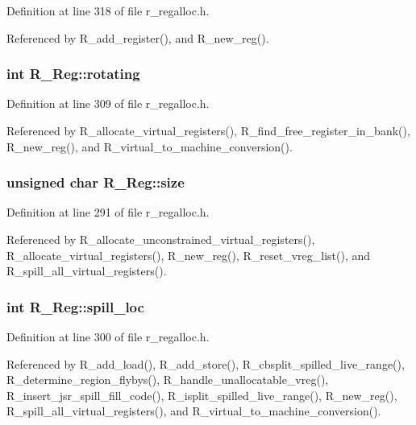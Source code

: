 Definition at line 318 of file r\_\-regalloc.h.

Referenced by R\_\-add\_\-register(), and R\_\-new\_\-reg().
\subsubsection{\setlength{\rightskip}{0pt plus 5cm}int \bf{R\_\-Reg::rotating}}\label{structR__Reg_c0f790c760511d309b4bd3004cc4280f}




Definition at line 309 of file r\_\-regalloc.h.

Referenced by R\_\-allocate\_\-virtual\_\-registers(), R\_\-find\_\-free\_\-register\_\-in\_\-bank(), R\_\-new\_\-reg(), and R\_\-virtual\_\-to\_\-machine\_\-conversion().
\subsubsection{\setlength{\rightskip}{0pt plus 5cm}unsigned char \bf{R\_\-Reg::size}}\label{structR__Reg_0bcd81c95d4df3bcfeda54c890a94004}




Definition at line 291 of file r\_\-regalloc.h.

Referenced by R\_\-allocate\_\-unconstrained\_\-virtual\_\-registers(), R\_\-allocate\_\-virtual\_\-registers(), R\_\-new\_\-reg(), R\_\-reset\_\-vreg\_\-list(), and R\_\-spill\_\-all\_\-virtual\_\-registers().
\subsubsection{\setlength{\rightskip}{0pt plus 5cm}int \bf{R\_\-Reg::spill\_\-loc}}\label{structR__Reg_9cc6b324e182eef50ec102fd0baf8c8e}




Definition at line 300 of file r\_\-regalloc.h.

Referenced by R\_\-add\_\-load(), R\_\-add\_\-store(), R\_\-cbsplit\_\-spilled\_\-live\_\-range(), R\_\-determine\_\-region\_\-flybys(), R\_\-handle\_\-unallocatable\_\-vreg(), R\_\-insert\_\-jsr\_\-spill\_\-fill\_\-code(), R\_\-isplit\_\-spilled\_\-live\_\-range(), R\_\-new\_\-reg(), R\_\-spill\_\-all\_\-virtual\_\-registers(), and R\_\-virtual\_\-to\_\-machine\_\-conversion().
